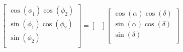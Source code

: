 \documentclass[twocolumn]{aastex62}
\begin{document}
\appendix
\begin{equation*}
\begin{bmatrix}
\cos(\phi_1)\cos(\phi_2)\\
\sin(\phi_1)\cos(\phi_2)\\
\sin(\phi_2)\\
\end{bmatrix}
 = 
\begin{bmatrix}

\end{bmatrix}
\begin{bmatrix}
\cos(\alpha)\cos(\delta)\\
\sin(\alpha)\cos(\delta)\\
\sin(\delta)\\
\end{bmatrix}
\label{eq:rotmat}
\end{equation*}



\end{document}
